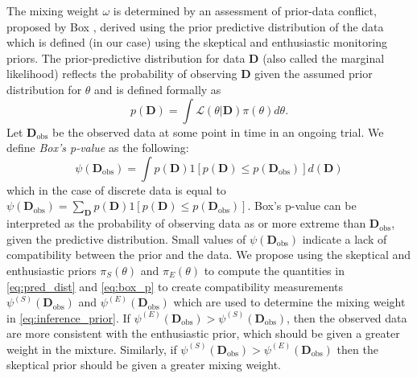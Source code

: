 \documentclass[useAMS,usenatbib,referee]{biom}
\begin{document}
The mixing weight $\omega$ is determined by an assessment of prior-data conflict, proposed by Box \citep{Box1980}, derived using the prior predictive distribution of 
the data which is defined (in our case) using the skeptical and enthusiastic monitoring priors.
The prior-predictive distribution for data $\mathbf{D}$ (also called the marginal likelihood) reflects the probability of observing $\mathbf{D}$ given 
the assumed prior distribution for $\theta$ and is defined formally as
\begin{equation}\label{eq:pred_dist}
p(\mathbf{D})=\int \mathcal{L}(\theta|\mathbf{D})\pi(\theta)d\theta.
\end{equation}
Let $\mathbf{D}_{\text{obs}}$ be the observed data at some point in time in an ongoing trial. 
We define \textit{Box's p-value} as the following:
\begin{equation}\label{eq:box_p}
\psi({\mathbf{D}_{\text{obs}}})=\int {p(\mathbf{D})}  1[p(\mathbf{D})\leq p(\mathbf{D}_{\text{obs}})] d(\mathbf{D})
\end{equation}
which in the case of discrete data is equal to $\psi({\mathbf{D}_{\text{obs}}})=\sum_{\mathbf{D}}p(\mathbf{D})1[p(\mathbf{D})\leq p(\mathbf{D}_{\text{obs}})]$.
%
Box's p-value can be interpreted as the probability of observing data as or more extreme than $\mathbf{D}_{\text{obs}}$, given the predictive distribution. 
%
Small values of $\psi({\mathbf{D}_{\text{obs}}})$ indicate a lack of compatibility between the prior and the data. 
%
We propose using the skeptical and enthusiastic priors $\pi_S(\theta)$ and $\pi_E(\theta)$ to compute the quantities in \eqref{eq:pred_dist} and \eqref{eq:box_p} to create compatibility measurements $\psi^{(S)}(\mathbf{D}_{\text{obs}})$ and $\psi^{(E)}(\mathbf{D}_{\text{obs}})$ which are used to determine the mixing weight in \eqref{eq:inference_prior}. 
%
If $\psi^{(E)}(\mathbf{D}_{\text{obs}})>\psi^{(S)}(\mathbf{D}_{\text{obs}})$, then the observed data are more consistent with the enthusiastic prior, which should be given a greater weight in the mixture. Similarly, if $\psi^{(S)}(\mathbf{D}_{\text{obs}})>\psi^{(E)}(\mathbf{D}_{\text{obs}})$ then the skeptical prior should be given a greater mixing weight.
\end{document}
